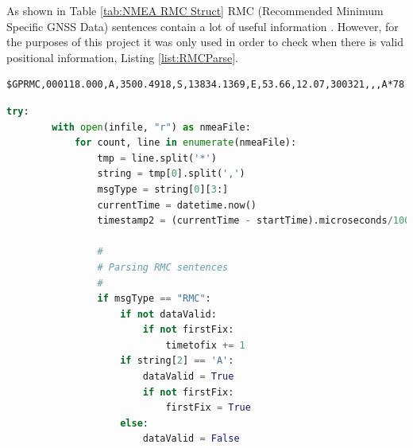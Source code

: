 As shown in Table \ref{tab:NMEA RMC Struct} RMC (Recommended Minimum Specific GNSS Data) sentences contain a lot of useful information \cite{RN71}. However, for the purposes of this
project it was only used in order to check when there is valid positional information, Listing \ref{list:RMCParse}.

\begin{verbatim}
$GPRMC,000118.000,A,3500.4918,S,13834.1369,E,53.66,12.07,300321,,,A*78
\end{verbatim}

\begin{lstlisting}[language=Python, label=list:RMCParse, caption=Parsing RMC sentences for data and fix validity checks]
    try:
        with open(infile, "r") as nmeaFile:
            for count, line in enumerate(nmeaFile):
                tmp = line.split('*')
                string = tmp[0].split(',')
                msgType = string[0][3:]
                currentTime = datetime.now()
                timestamp2 = (currentTime - startTime).microseconds/1000000
    
                #
                # Parsing RMC sentences
                #
                if msgType == "RMC":
                    if not dataValid:
                        if not firstFix:
                            timetofix += 1
                    if string[2] == 'A':
                        dataValid = True
                        if not firstFix:
                            firstFix = True
                    else:
                        dataValid = False
    \end{lstlisting}


